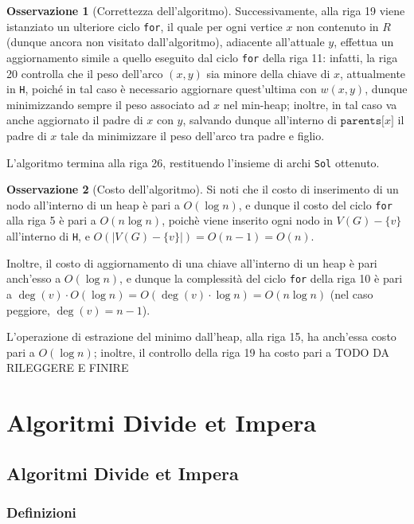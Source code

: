 \documentclass[14pt]{extreport}
\theoremstyle{definition}
\theoremstyle{definition}
\newtheorem{remark}{Osservazione}[subsection]
\begin{document}
\begin{remark}[Correttezza dell'algoritmo]
    Successivamente, alla riga 19 viene istanziato un ulteriore ciclo \texttt{for}, il quale per ogni vertice $x$ non contenuto in $R$ (dunque ancora non visitato dall'algoritmo), adiacente all'attuale $y$, effettua un aggiornamento simile a quello eseguito dal ciclo \texttt{for} della riga 11: infatti, la riga 20 controlla che il peso dell'arco $(x, y)$ sia minore della chiave di $x$, attualmente in \texttt{H}, poiché in tal caso è necessario aggiornare quest'ultima con $w(x, y)$, dunque minimizzando sempre il peso associato ad $x$ nel min-heap; inoltre, in tal caso va anche aggiornato il padre di $x$ con $y$, salvando dunque all'interno di $\texttt{parents[}x\texttt{]}$ il padre di $x$ tale da minimizzare il peso dell'arco tra padre e figlio.

    L'algoritmo termina alla riga 26, restituendo l'insieme di archi \texttt{Sol} ottenuto.
\end{remark}

\begin{remark}[Costo dell'algoritmo]
    Si noti che il costo di inserimento di un nodo all'interno di un heap è pari a $O(\log n)$, e dunque il costo del ciclo \texttt{for} alla riga 5 è pari a $O (n \log n)$, poichè viene inserito ogni nodo in $V(G) - \{v\}$ all'interno di \texttt{H}, e $O(|V(G) - \{v\}|) = O(n - 1) = O(n)$.

    Inoltre, il costo di aggiornamento di una chiave all'interno di un heap è pari anch'esso a $O(\log n)$, e dunque la complessità del ciclo \texttt{for} della riga 10 è pari a $\deg(v) \cdot O(\log n) = O(\deg(v) \cdot \log n) = O(n \log n)$ (nel caso peggiore, $\deg(v) = n - 1$).

    L'operazione di estrazione del minimo dall'heap, alla riga 15, ha anch'essa costo pari a $O(\log n)$; inoltre, il controllo della riga 19 ha costo pari a TODO DA RILEGGERE E FINIRE
\end{remark}

\chapter{Algoritmi Divide et Impera}

\section{Algoritmi Divide et Impera}

\subsection{Definizioni}
\end{document}
